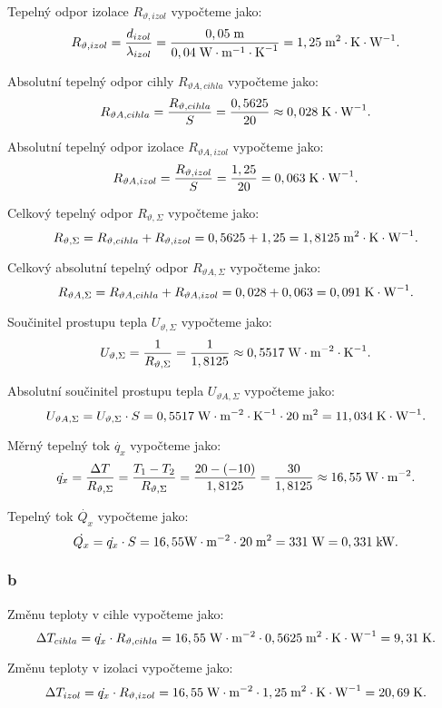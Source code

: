 \documentclass{article}
\begin{document}
Tepelný odpor izolace $R_{\vartheta,izol}$ vypočteme jako:
$$
    R_{\vartheta,izol} = \frac{d_{izol}}{\lambda_{izol}} = \frac{0,05 \; \textrm{m}}{0,04 \; \textrm{W} \cdot \textrm{m}^{-1} \cdot \textrm{K}^{-1}} = 1,25 \; \textrm{m}^{\textrm{2}} \cdot \textrm{K} \cdot \textrm{W}^{-1}.
$$

Absolutní tepelný odpor cihly $R_{\vartheta A,cihla}$ vypočteme jako:
$$
    R_{\vartheta A,cihla} = \frac{R_{\vartheta,cihla}}{S} = \frac{0,5625}{20} \approx 0,028 \; \textrm{K} \cdot \textrm{W}^{-1}.
$$

Absolutní tepelný odpor izolace $R_{\vartheta A,izol}$ vypočteme jako:
$$
    R_{\vartheta A,izol} = \frac{R_{\vartheta,izol}}{S} = \frac{1,25}{20} = 0,063 \; \textrm{K} \cdot \textrm{W}^{-1}.
$$

Celkový tepelný odpor $R_{\vartheta,\Sigma}$ vypočteme jako:
$$
    R_{\vartheta,\Sigma} = R_{\vartheta,cihla} + R_{\vartheta,izol} = 0,5625 + 1,25 = 1,8125 \; \textrm{m}^{\textrm{2}} \cdot \textrm{K} \cdot \textrm{W}^{-1}.
$$

Celkový absolutní tepelný odpor $R_{\vartheta A,\Sigma}$ vypočteme jako:
$$
    R_{\vartheta A,\Sigma} = R_{\vartheta A,cihla} + R_{\vartheta A,izol} = 0,028 + 0,063 = 0,091 \; \textrm{K} \cdot \textrm{W}^{-1}.
$$

Součinitel prostupu tepla $U_{\vartheta,\Sigma}$ vypočteme jako:
$$
    U_{\vartheta,\Sigma} = \frac{1}{R_{\vartheta,\Sigma}} = \frac{1}{1,8125} \approx 0,5517 \; \textrm{W} \cdot \textrm{m}^{-2} \cdot \textrm{K}^{-1}.
$$

Absolutní součinitel prostupu tepla $U_{\vartheta A,\Sigma}$ vypočteme jako:
$$
    U_{\vartheta A,\Sigma} = U_{\vartheta,\Sigma} \cdot S = 0,5517 \; \textrm{W} \cdot \textrm{m}^{-2} \cdot \textrm{K}^{-1} \cdot 20 \; \textrm{m}^{\textrm{2}} = 11,034 \; \textrm{K} \cdot \textrm{W}^{-1}.
$$

Měrný tepelný tok $\dot{q_x}$ vypočteme jako:
$$
    \dot{q_x} = \frac{\Delta T}{R_{\vartheta,\Sigma}} = \frac{T_1 - T_2}{R_{\vartheta,\Sigma}} = \frac{20 - (-10)}{1,8125} = \frac{30}{1,8125} \approx 16,55 \; \textrm{W} \cdot \textrm{m}^{-2}.
$$

Tepelný tok $\dot{Q_x}$ vypočteme jako:
$$
    \dot{Q_x} = \dot{q_x} \cdot S = 16,55 \textrm{W} \cdot \textrm{m}^{-2} \cdot 20 \; \textrm{m}^{\textrm{2}} = 331 \; \textrm{W} = 0,331 \; \textrm{kW}.
$$


\subsubsection{b}
Změnu teploty v cihle vypočteme jako:
$$
    \Delta T_{cihla} = \dot{q_x} \cdot R_{\vartheta,cihla} = 16,55 \; \textrm{W} \cdot \textrm{m}^{-2} \cdot 0,5625 \; \textrm{m}^{\textrm{2}} \cdot \textrm{K} \cdot \textrm{W}^{-1} = 9,31 \; \textrm{K}.
$$

Změnu teploty v izolaci vypočteme jako:
$$
    \Delta T_{izol} = \dot{q_x} \cdot R_{\vartheta,izol} = 16,55 \; \textrm{W} \cdot \textrm{m}^{-2} \cdot 1,25 \; \textrm{m}^{\textrm{2}} \cdot \textrm{K} \cdot \textrm{W}^{-1} = 20,69 \; \textrm{K}.
$$
\end{document}
